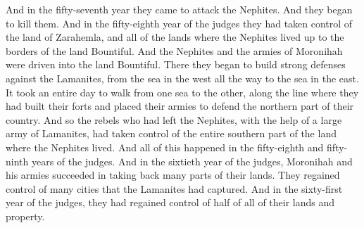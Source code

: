 And in the fifty-seventh year they came to attack the Nephites. And they began to kill them. And in the fifty-eighth year of the judges they had taken control of the land of Zarahemla, and all of the lands where the Nephites lived up to the borders of the land Bountiful.
\bverse \iffalse And the Nephites and the armies of Moronihah were driven even into the land of Bountiful; \fi
And the Nephites and the armies of Moronihah were driven into the land Bountiful.
\bverse \iffalse And there they did fortify against the Lamanites, from the west sea, even unto the east; it being a day's journey for a Nephite, on the line which they had fortified and stationed their armies to defend their north country. \fi
There they began to build strong defenses against the Lamanites, from the sea in the west all the way to the sea in the east. It took an entire day to walk from one sea to the other, along the line where they had built their forts and placed their armies to defend the northern part of their country.
\bverse \iffalse And thus those dissenters of the Nephites, with the help of a numerous army of the Lamanites, had obtained all the possession of the Nephites which was in the land southward. And all this was done in the fifty and eighth and ninth years of the reign of the judges. \fi
And so the rebels who had left the Nephites, with the help of a large army of Lamanites, had taken control of the entire southern part of the land where the Nephites lived. And all of this happened in the fifty-eighth and fifty-ninth years of the judges.
\bverse \iffalse And it came to pass in the sixtieth year of the reign of the judges, Moronihah did succeed with his armies in obtaining many parts of the land; yea, they regained many cities which had fallen into the hands of the Lamanites. \fi
And in the sixtieth year of the judges, Moronihah and his armies succeeded in taking back many parts of their lands. They regained control of many cities that the Lamanites had captured.
\bverse \iffalse And it came to pass in the sixty and first year of the reign of the judges they succeeded in regaining even the half of all their possessions. \fi
And in the sixty-first year of the judges, they had regained control of half of all of their lands and property.
\bverse \iffalse Now this great loss of the Nephites, and the great slaughter which was among them, would not have happened had it not been for their wickedness and their abomination which was among them; yea, and it was among those also who professed to belong to the church of God. \fi
